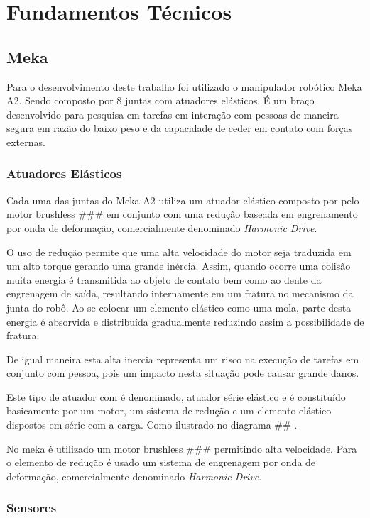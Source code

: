 \chapter{Fundamentos Técnicos}

\section{Meka}

Para o desenvolvimento deste trabalho foi utilizado o manipulador robótico Meka A2. Sendo composto por 8 juntas com atuadores elásticos. É um braço desenvolvido para pesquisa em tarefas em interação com pessoas de maneira segura em razão do baixo peso e da capacidade de ceder em contato com forças externas. 

\subsection{Atuadores Elásticos}

Cada uma das juntas do Meka A2 utiliza um atuador elástico composto por pelo motor brushless ### em conjunto com uma redução baseada em engrenamento por onda de deformação, comercialmente denominado \textit{Harmonic Drive}.

O uso de redução permite que uma alta velocidade do motor seja traduzida em um alto torque gerando uma grande inércia. Assim, quando ocorre uma colisão muita energia é transmitida ao objeto de contato bem como ao dente da engrenagem de saída, resultando internamente em um fratura no mecanismo da junta do robô. Ao se colocar um elemento elástico como uma mola, parte desta energia é absorvida e distribuída gradualmente reduzindo assim a possibilidade de fratura. 

De igual maneira esta alta inercia representa um risco na execução de tarefas em conjunto com pessoa, pois um impacto nesta situação pode causar grande danos.

Este tipo de atuador com é denominado, atuador série elástico e é constituído basicamente por um motor, um sistema de redução e um elemento elástico dispostos em série com a carga. Como ilustrado no diagrama ## .


No meka é utilizado um motor brushless ### permitindo alta velocidade. Para o elemento de redução é usado um sistema de engrenagem por onda de deformação, comercialmente denominado \textit{Harmonic Drive}.

\subsection{Sensores}

